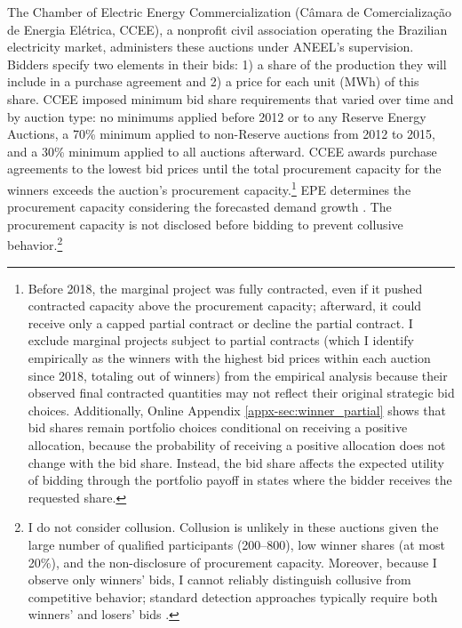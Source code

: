 \documentclass[12pt]{article}
\theoremstyle{definition} %
\begin{document}
The Chamber of Electric Energy Commercialization (C\^amara de Comercializa\c{c}\~ao de Energia El\'etrica, CCEE), a nonprofit civil association operating the Brazilian electricity market, administers these auctions under ANEEL's supervision. Bidders specify two elements in their bids: 1) a share of the production they will include in a purchase agreement and 2) a price for each unit (MWh) of this share. CCEE imposed minimum bid share requirements that varied over time and by auction type: no minimums applied before 2012 or to any Reserve Energy Auctions, a 70\% minimum applied to non-Reserve auctions from 2012 to 2015, and a 30\% minimum applied to all auctions afterward. CCEE awards purchase agreements to the lowest bid prices until the total procurement capacity for the winners exceeds the auction's procurement capacity.\footnote{
Before 2018, the marginal project was fully contracted, even if it pushed contracted capacity above the procurement capacity; afterward, it could receive only a capped partial contract or decline the partial contract. I exclude marginal projects subject to partial contracts (which I identify empirically as the winners with the highest bid prices within each auction since 2018, totaling  out of  winners) from the empirical analysis because their observed final contracted quantities may not reflect their original strategic bid choices. Additionally, Online Appendix \ref{appx-sec:winner_partial} shows that bid shares remain portfolio choices conditional on receiving a positive allocation, because the probability of receiving a positive allocation does not change with the bid share. Instead, the bid share affects the expected utility of bidding through the portfolio payoff in states where the bidder receives the requested share.
} EPE determines the procurement capacity considering the forecasted demand growth \citep{Rosa2013}. The procurement capacity is not disclosed before bidding to prevent collusive behavior.\footnote{
I do not consider collusion. Collusion is unlikely in these auctions given the large number of qualified participants (200--800), low winner shares (at most 20\%), and the non-disclosure of procurement capacity. Moreover, because I observe only winners' bids, I cannot reliably distinguish collusive from competitive behavior; standard detection approaches typically require both winners' and losers' bids \citep[e.g.,][]{Porter1993,Chassang2022,Kawai2022}.
}
\end{document}
